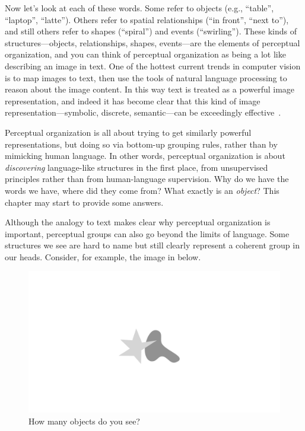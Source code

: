 Now let's look at each of these words. Some refer to objects (e.g., ``table'', ``laptop'', ``latte''). Others refer to spatial relationships (``in front'', ``next to''), and still others refer to shapes (``spiral'') and events (``swirling''). These kinds of structures—objects, relationships, shapes, events—are the elements of perceptual organization, and you can think of perceptual organization as being a lot like describing an image in text. One of the hottest current trends in computer vision is to map images to text, then use the tools of natural language processing to reason about the image content. In this way text is treated as a powerful image representation, and indeed it has become clear that this kind of image representation—symbolic, discrete, semantic—can be exceedingly effective~\cite{alayrac2022flamingo,wu2023visual,gupta2023visual,suris2023vipergpt}.

Perceptual organization is all about trying to get similarly powerful representations, but doing so via bottom-up grouping rules, rather than by mimicking human language. In other words, perceptual organization is about \textit{discovering} language-like structures in the first place, from unsupervised principles rather than from human-language supervision. Why do we have the words we have, where did they come from? What exactly is an \textit{object}? This chapter may start to provide some answers.

Although the analogy to text makes clear why perceptual organization is important, perceptual groups can also go beyond the limits of language. Some structures we see are hard to name but still clearly represent a coherent group in our heads. Consider, for example, the image in \fig{\ref{fig:perceptual_organization:perc_org_nonsemantic_example}} below.
\begin{figure}[h]
    \centerline{
        \includegraphics[width=0.35\linewidth]{./figures/perceptual_organization/perc_org_nonsemantic_example.pdf}
    }
    \caption{How many objects do you see?}
    \label{fig:perceptual_organization:perc_org_nonsemantic_example}
\end{figure}

